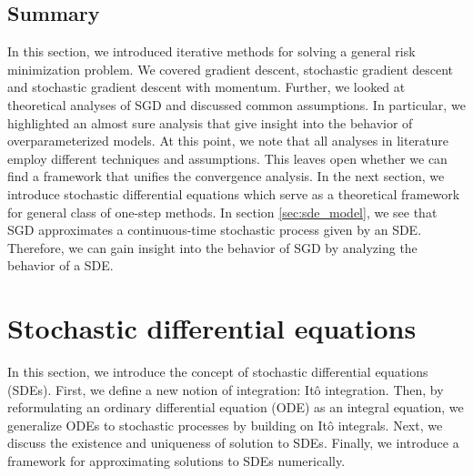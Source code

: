 \documentclass[12pt]{article}
\theoremstyle{definition}
\numberwithin{equation}{section}
\begin{document}

\subsection{Summary}
In this section, we introduced iterative methods for solving a general risk minimization problem. We covered gradient descent, stochastic gradient descent and stochastic gradient descent with momentum. Further, we looked at theoretical analyses of SGD and discussed common assumptions. In particular, we highlighted an almost sure analysis that give insight into the behavior of overparameterized models. 
At this point, we note that all analyses in literature employ different techniques and assumptions. This leaves open whether we can find a framework that unifies the convergence analysis. In the next section, we introduce stochastic differential equations which serve as a theoretical framework for general class of one-step methods. In section \autoref{sec:sde_model}, we see that SGD approximates a continuous-time stochastic process given by an SDE. Therefore, we can gain insight into the behavior of SGD by analyzing the behavior of a SDE.

\section{Stochastic differential equations}
\label{sec:BackgroundSDETheory}
In this section, we introduce the concept of stochastic differential equations (SDEs). First, we define a new notion of integration: Itô integration. Then, by reformulating an ordinary differential equation (ODE) as an integral equation, we generalize ODEs to stochastic processes by building on Itô integrals. Next, we discuss the existence and uniqueness of solution to SDEs. Finally, we introduce a framework for approximating solutions to SDEs numerically.
\end{document}
